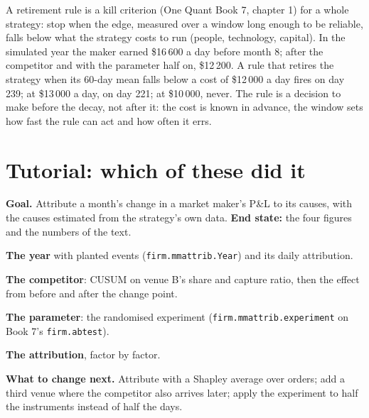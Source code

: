 A retirement rule is a kill criterion (One Quant Book 7, chapter 1) for a whole strategy: stop when the edge, measured over a window long enough to
be reliable, falls below what the strategy costs to run (people, technology, capital). In the simulated year the maker earned \$16\,600 a day before
month 8; after the competitor and with the parameter half on, \$12\,200. A rule that retires the strategy when its 60-day mean falls below a
cost of \$12\,000 a day fires on day 239; at \$13\,000 a day, on day 221; at \$10\,000, never. The rule is a decision to make before the decay, not
after it: the cost is known in advance, the window sets how fast the rule can act and how often it errs.

\section{Tutorial: which of these did it}\label{tut:hf:pnl-analytics-and-the-strategy-lifecycle:tut}

\begin{tutorial}
\textbf{Goal.} Attribute a month's change in a market maker's P\&L to its causes, with the causes estimated from the strategy's own data.
\textbf{End state:} the four figures and the numbers of the text.
\begin{tutsteps}
\item \textbf{The year} with planted events (\texttt{firm.mmattrib.Year}) and its daily attribution.
\item \textbf{The competitor}: CUSUM on venue B's share and capture ratio, then the effect from before and after the change point.
\item \textbf{The parameter}: the randomised experiment (\texttt{firm.mmattrib.experiment} on Book 7's \texttt{firm.abtest}).
\label{lst:hf:pnl-analytics-and-the-strategy-lifecycle:exp}
\item \textbf{The attribution}, factor by factor.
\label{lst:hf:pnl-analytics-and-the-strategy-lifecycle:change}
\end{tutsteps}
\textbf{What to change next.} Attribute with a Shapley average over orders; add a third venue where the competitor also arrives later; apply the
experiment to half the instruments instead of half the days.
\end{tutorial}

